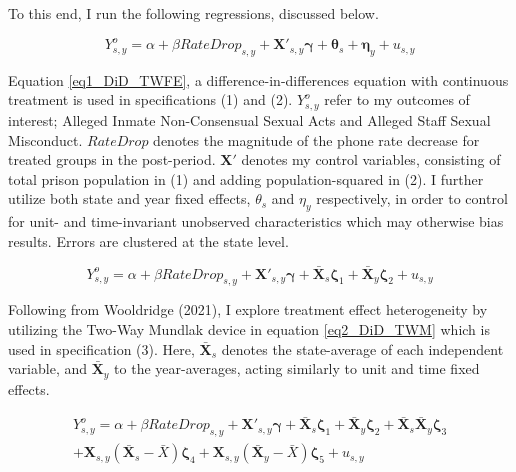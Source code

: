To this end, I run the following regressions, discussed below. 

\begin{equation}
	Y^{o}_{s,y} = \alpha + \beta RateDrop_{s,y} + \boldsymbol{X'}_{s,y} \boldsymbol{\gamma} + \boldsymbol{\theta}_{s} + \boldsymbol{\eta}_{y} + u_{s,y}
	\label{eq1_DiD_TWFE}
\end{equation}

Equation \ref{eq1_DiD_TWFE}, a difference-in-differences equation with continuous treatment is used in specifications (1) and (2). $Y^{o}_{s,y}$ refer to my outcomes of interest; Alleged Inmate Non-Consensual Sexual Acts and Alleged Staff Sexual Misconduct. $RateDrop$ denotes the magnitude of the phone rate decrease for treated groups in the post-period. $\boldsymbol{X'}$ denotes my control variables, consisting of total prison population in (1) and adding population-squared in (2). I further utilize both state and year fixed effects, $\theta_{s}$ and $\eta_{y}$ respectively, in order to control for unit- and time-invariant unobserved characteristics which may otherwise bias results. Errors are clustered at the state level. 

\begin{equation}
	Y^{o}_{s,y} = \alpha + \beta RateDrop_{s,y} + \boldsymbol{X'}_{s,y} \boldsymbol{\gamma} + \boldsymbol{\bar{X}}_{s} \boldsymbol{\zeta}_1 + \boldsymbol{\bar{X}}_{y} \boldsymbol{\zeta}_2 + u_{s,y}
	\label{eq2_DiD_TWM}
\end{equation}

Following from Wooldridge (2021), I explore treatment effect heterogeneity by utilizing the Two-Way Mundlak device in equation \ref{eq2_DiD_TWM} which is used in specification (3). Here, $\boldsymbol{\bar{X}}_{s}$ denotes the state-average of each independent variable, and $\boldsymbol{\bar{X}}_{y}$ to the year-averages, acting similarly to unit and time fixed effects. 

\begin{equation}
	\begin{split}
		Y^{o}_{s,y} = \alpha + \beta RateDrop_{s,y} + \boldsymbol{X'}_{s,y} \boldsymbol{\gamma} + \boldsymbol{\bar{X}}_{s} \boldsymbol{\zeta}_1 + \boldsymbol{\bar{X}}_{y} \boldsymbol{\zeta}_2 + \boldsymbol{\bar{X}}_{s} \boldsymbol{\bar{X}}_{y} \boldsymbol{\zeta}_3 \\ 
			+ \boldsymbol{X}_{s,y} (\boldsymbol{\bar{X}}_{s} - \bar{X}) \boldsymbol{\zeta}_4 + \boldsymbol{X}_{s,y} (\boldsymbol{\bar{X}}_{y} - \bar{X}) \boldsymbol{\zeta}_5 + u_{s,y}
		\label{eq3_DiD_TWM_int}
	\end{split}
\end{equation}

